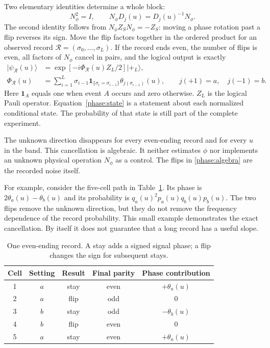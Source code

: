 \documentclass[11pt,a4paper]{article}
\numberwithin{equation}{section}
\theoremstyle{remark}
\begin{document}
Two elementary identities determine a whole block:
\begin{equation}
 N_\phi^2=I,
 \qquad
 N_\phi D_j(u)=D_j(u)^{-1}N_\phi.
 \label{phase:algebra}
\end{equation}
The second identity follows from $N_\phi Z_SN_\phi=-Z_S$: moving a phase
rotation past a flip reverses its sign.  Move the flip factors together in the
ordered product for an observed record
$\mathcal R=(\sigma_0,\ldots,\sigma_L)$.  If the record ends even, the number
of flips is even, all factors of $N_\phi$ cancel in pairs, and the logical
output is exactly
\begin{align}
 |\psi_{\mathcal R}(u)\rangle
 &=\exp[-i\Phi_{\mathcal R}(u)Z_L/2]|+_L\rangle,\label{phase:state}\\
 \Phi_{\mathcal R}(u)
 &=\sum_{i=1}^{L}\sigma_{i-1}
   \mathbf 1_{\{\sigma_i=\sigma_{i-1}\}}
   \theta_{j(\sigma_{i-1})}(u),
 \qquad j(+1)=a,\quad j(-1)=b.
 \label{phase:recordfunction}
\end{align}
Here $\mathbf 1_A$ equals one when event $A$ occurs and zero otherwise.
$Z_L$ is the logical Pauli operator.  Equation~\eqref{phase:state} is a
statement about each normalized conditional state.  The probability of that
state is still part of the complete experiment.

The unknown direction disappears for every even-ending record and for every
$u$ in the band.  This cancellation is algebraic.  It neither estimates
$\phi$ nor implements an unknown physical operation $N_\phi$ as a control.
The flips in \eqref{phase:algebra} are the recorded noise itself.

For example, consider the five-cell path in Table~\ref{phase:example}.
Its phase is $2\theta_a(u)-\theta_b(u)$ and its probability is
$q_a(u)^2p_a(u)q_b(u)p_b(u)$.  The two flips remove the unknown direction, but
they do not remove the frequency dependence of the record probability.
This small example demonstrates the exact cancellation.  By itself it does
not guarantee that a long record has a useful slope.

\begin{table}[htbp]
\centering
\caption{One even-ending record.  A stay adds a signed signal phase; a flip
changes the sign for subsequent stays.}
\label{phase:example}
\begin{tabular}{ccccc}
\toprule
Cell & Setting & Result & Final parity & Phase contribution\\
\midrule
1 & $a$ & stay & even & $+\theta_a(u)$\\
2 & $a$ & flip & odd & $0$\\
3 & $b$ & stay & odd & $-\theta_b(u)$\\
4 & $b$ & flip & even & $0$\\
5 & $a$ & stay & even & $+\theta_a(u)$\\
\bottomrule
\end{tabular}
\end{table}
\end{document}
